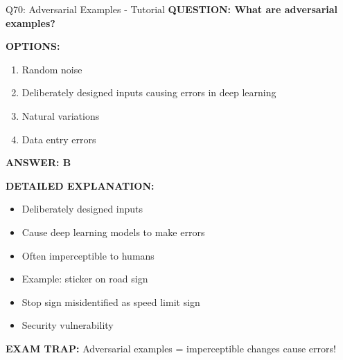 \documentclass[8pt]{beamer}
\begin{document}
	\begin{frame}{Q70: Adversarial Examples - Tutorial}
		\fontsize{6.5}{7.5}\selectfont
		\textbf{QUESTION: What are adversarial examples?}
		
		\vspace{0.1cm}
		\textbf{OPTIONS:}
		\begin{enumerate}
			\item Random noise
			\item Deliberately designed inputs causing errors in deep learning
			\item Natural variations
			\item Data entry errors
		\end{enumerate}
		
		\vspace{0.1cm}
		\textcolor{myblue}{\textbf{ANSWER: B}}
		
		\vspace{0.1cm}
		\textbf{DETAILED EXPLANATION:}
		\begin{itemize}
			\item Deliberately designed inputs
			\item Cause deep learning models to make errors
			\item Often imperceptible to humans
			\item Example: sticker on road sign
			\item Stop sign misidentified as speed limit sign
			\item Security vulnerability
		\end{itemize}
		
		\vspace{0.1cm}
		\textcolor{myred}{\textbf{EXAM TRAP:}} Adversarial examples = \textcolor{myblue}{imperceptible changes cause errors}!
	\end{frame}
	
\end{document}
